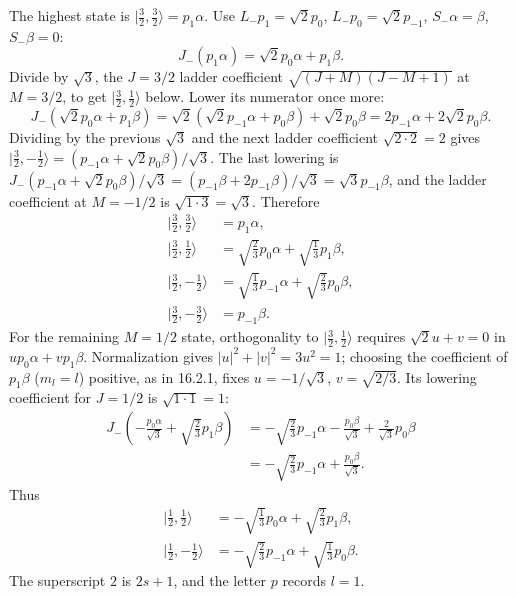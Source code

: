 The highest state is $|\tfrac32,\tfrac32\rangle=p_1\alpha$.
Use $L_-p_1=\sqrt2p_0$, $L_-p_0=\sqrt2p_{-1}$,
$S_-\alpha=\beta$, $S_-\beta=0$:
\[
J_-(p_1\alpha)=\sqrt2p_0\alpha+p_1\beta.
\]
Divide by $\sqrt3$, the $J=3/2$ ladder coefficient
$\sqrt{(J+M)(J-M+1)}$ at $M=3/2$, to get
$|\tfrac32,\tfrac12\rangle$ below. Lower its numerator once more:
\[
J_-(\sqrt2p_0\alpha+p_1\beta)
=\sqrt2(\sqrt2p_{-1}\alpha+p_0\beta)+\sqrt2p_0\beta
=2p_{-1}\alpha+2\sqrt2p_0\beta.
\]
Dividing by the previous $\sqrt3$ and the next ladder coefficient
$\sqrt{2\cdot2}=2$ gives $|\tfrac32,-\tfrac12\rangle
=(p_{-1}\alpha+\sqrt2p_0\beta)/\sqrt3$.
The last lowering is
$J_-(p_{-1}\alpha+\sqrt2p_0\beta)/\sqrt3
=(p_{-1}\beta+2p_{-1}\beta)/\sqrt3=\sqrt3p_{-1}\beta$, and the ladder
coefficient at $M=-1/2$ is $\sqrt{1\cdot3}=\sqrt3$. Therefore
\[
\boxed{\begin{aligned}
|\tfrac32,\tfrac32\rangle&=p_1\alpha,\\
|\tfrac32,\tfrac12\rangle&=\sqrt{\tfrac23}p_0\alpha+
\sqrt{\tfrac13}p_1\beta,\\
|\tfrac32,-\tfrac12\rangle&=\sqrt{\tfrac13}p_{-1}\alpha+
\sqrt{\tfrac23}p_0\beta,\\
|\tfrac32,-\tfrac32\rangle&=p_{-1}\beta.
\end{aligned}}
\]
For the remaining $M=1/2$ state, orthogonality to
$|\tfrac32,\tfrac12\rangle$ requires $\sqrt2u+v=0$ in
$u p_0\alpha+v p_1\beta$. Normalization gives $|u|^2+|v|^2=3u^2=1$;
choosing the coefficient of $p_1\beta$ ($m_l=l$) positive, as in
16.2.1, fixes $u=-1/\sqrt3$, $v=\sqrt{2/3}$.
Its lowering coefficient for $J=1/2$ is $\sqrt{1\cdot1}=1$:
\[
\begin{aligned}
J_-\left(-\frac{p_0\alpha}{\sqrt3}
+\sqrt{\frac23}p_1\beta\right)
&=-\sqrt{\frac23}p_{-1}\alpha
-\frac{p_0\beta}{\sqrt3}+\frac2{\sqrt3}p_0\beta\\
&=-\sqrt{\frac23}p_{-1}\alpha+\frac{p_0\beta}{\sqrt3}.
\end{aligned}
\]
Thus
\[
\boxed{\begin{aligned}
|\tfrac12,\tfrac12\rangle&=-\sqrt{\tfrac13}p_0\alpha+
\sqrt{\tfrac23}p_1\beta,\\
|\tfrac12,-\tfrac12\rangle&=-\sqrt{\tfrac23}p_{-1}\alpha+
\sqrt{\tfrac13}p_0\beta.
\end{aligned}}
\]
The superscript $2$ is $2s+1$, and the letter $p$ records $l=1$.

